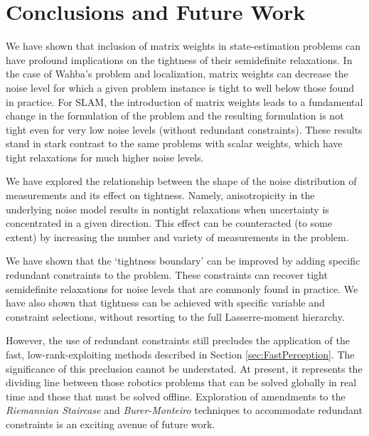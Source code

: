 \documentclass[lettersize,journal]{IEEEtran}
\begin{document}
\section{Conclusions and Future Work}\label{sec:Conclusions}

We have shown that inclusion of matrix weights in state-estimation problems can have profound implications on the tightness of their semidefinite relaxations. In the case of Wahba's problem and localization, matrix weights can decrease the noise level for which a given problem instance is tight to well below those found in practice. For SLAM, the introduction of matrix weights leads to a fundamental change in the formulation of the problem and the resulting formulation is not tight even for very low noise levels (without redundant constraints). These results stand in stark contrast to the same problems with scalar weights, which have tight relaxations for much higher noise levels.

We have explored the relationship between the shape of the noise distribution of measurements and its effect on tightness. Namely, anisotropicity in the underlying noise model results in nontight relaxations when uncertainty is concentrated in a given direction. This effect can be counteracted (to some extent) by increasing the number and variety of measurements in the problem.

We have shown that the `tightness boundary' can be improved by adding specific redundant constraints to the problem. These constraints can recover tight semidefinite relaxations for noise levels that are commonly found in practice. We have also shown that tightness can be achieved with specific variable and constraint selections, without resorting to the full Lasserre-moment hierarchy. 

However, the use of redundant constraints still precludes the application of the fast, low-rank-exploiting methods described in Section \ref{sec:FastPerception}. The significance of this preclusion cannot be understated. At present, it represents the dividing line between those robotics problems that can be solved globally in real time and those that must be solved offline. Exploration of amendments to the \emph{Riemannian Staircase} and \emph{Burer-Monteiro} techniques to accommodate redundant constraints is an exciting avenue of future work. 
\end{document}

